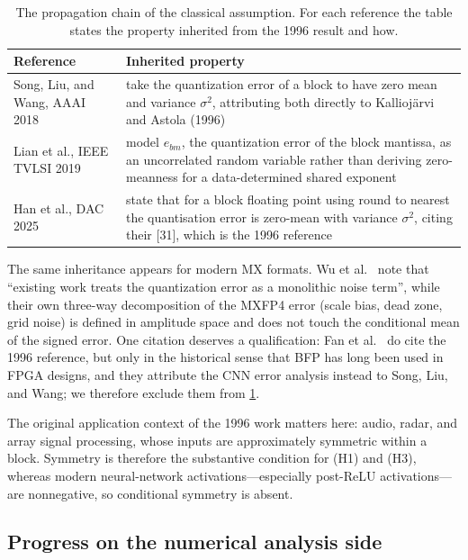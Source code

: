 \documentclass[review,hidelinks,oneeqnum,onetabnum,onefignum,onethmnum]{siamart251216}
\begin{document}
\begin{table}[!tb]
\centering
\caption{The propagation chain of the classical assumption. For each reference
the table states the property inherited from the 1996 result and how.}
\label{tab:chain}
\setlength{\tabcolsep}{5pt}
\small
\begin{tabular}{@{}p{}p{}@{}}
\toprule
Reference & Inherited property \\
\midrule
Song, Liu, and Wang, AAAI 2018 \cite{song2018} &
take the quantization error of a block to have zero mean and variance
$\sigma^2$, attributing both directly to Kallioj\"arvi and Astola (1996) \\
\addlinespace
Lian et al., IEEE TVLSI 2019 \cite{lian2019} &
model $e_{bm}$, the quantization error of the block mantissa, as an uncorrelated
random variable rather than deriving zero-meanness for a data-determined
shared exponent \\
\addlinespace
Han et al., DAC 2025 \cite{han2025} &
state that for a block floating point using round to nearest the quantisation
error is zero-mean with variance $\sigma^2$, citing their [31], which is the 1996
reference \\
\bottomrule
\end{tabular}
\end{table}

The same inheritance appears for modern MX formats. Wu et al.\
\cite{wu2026mxfp4} note that ``existing work treats the quantization error as a
monolithic noise term'', while their own three-way decomposition of the MXFP4
error (scale bias, dead zone, grid noise) is defined in amplitude space and does
not touch the conditional mean of the signed error. One citation deserves a
qualification: Fan et al.\ \cite{fan2018} do cite the 1996 reference, but only in
the historical sense that BFP has long been used in FPGA designs, and they
attribute the CNN error analysis instead to Song, Liu, and Wang; we therefore
exclude them from \cref{tab:chain}.

The original application context of the 1996 work matters here: audio, radar, and
array signal processing, whose inputs are approximately symmetric within a block.
Symmetry is therefore the substantive condition for (H1) and (H3), whereas modern
neural-network activations---especially post-ReLU activations---are nonnegative,
so conditional symmetry is absent.

\subsection{Progress on the numerical analysis side}
\end{document}
